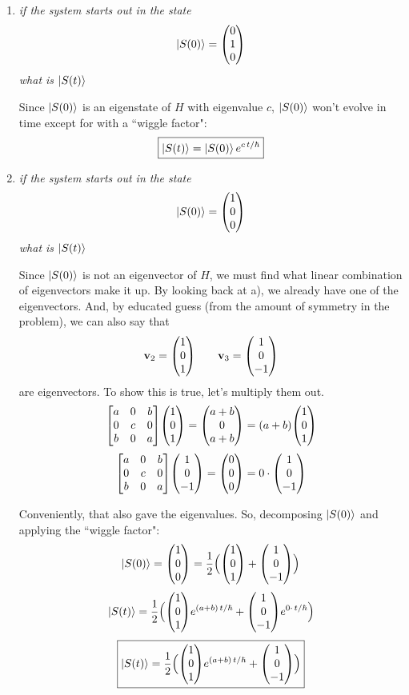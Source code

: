 \documentclass[12pt]{article}
\begin{document}
\begin{enumerate}[label=\alph*)]
\item \emph{if the system starts out in the state}
\[\ket{S(0)} = \mqty(0\\1\\0)\]
\emph{what is $\ket{S(t)}$}\bigskip

Since $\ket{S(0)}$ is an eigenstate of $H$ with eigenvalue $c$, $\ket{S(0)}$ won't evolve in time except for with a ``wiggle factor":
\[\boxed{\ket{S(t)} = \ket{S(0)} e^{c \, t/ \hbar}}\]

\item \emph{if the system starts out in the state}
\[\ket{S(0)} = \mqty(1\\0\\0)\]
\emph{what is $\ket{S(t)}$}\bigskip

Since $\ket{S(0)}$ is not an eigenvector of $H$, we must find what linear combination of eigenvectors make it up. By looking back at a), we already have one of the eigenvectors. And, by educated guess (from the amount of symmetry in the problem), we can also say that 
\[\vb{v}_2 = \mqty(1\\0\\1) \qquad \vb{v}_3 = \mqty(1\\0\\-1)\]
are eigenvectors. To show this is true, let's multiply them out.
\[\mqty[a&0&b\\0&c&0\\b&0&a]\mqty(1\\0\\1) = \mqty(a+b\\0\\a+b) = (a+b)\mqty(1\\0\\1)\]
\[\mqty[a&0&b\\0&c&0\\b&0&a]\mqty(1\\0\\-1) = \mqty(0\\0\\0) = 0 \cdot \mqty(1\\0\\-1)\]

Conveniently, that also gave the eigenvalues. So, decomposing $\ket{S(0)}$ and applying the ``wiggle factor":
\[\ket{S(0)} = \mqty(1\\0\\0) = \frac{1}{2}\Big(\mqty(1\\0\\1) + \mqty(1\\0\\-1)\Big)\]
\[\ket{S(t)}= \frac{1}{2}\Big(\mqty(1\\0\\1) e^{(a+b) \, t/ \hbar}+ \mqty(1\\0\\-1)e^{0 \cdot \, t/ \hbar}\Big)\]
\[\boxed{\ket{S(t)} = \frac{1}{2}\Big(\mqty(1\\0\\1) e^{(a+b) \, t/ \hbar}+ \mqty(1\\0\\-1)\Big)}\]
\end{enumerate}
\end{document}
